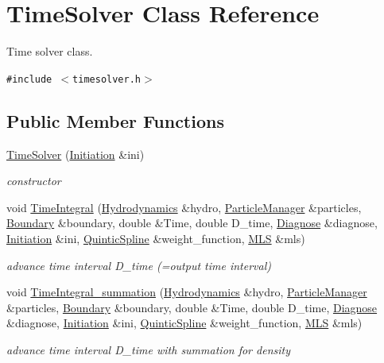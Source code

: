 \hypertarget{classTimeSolver}{
\section{TimeSolver Class Reference}
\label{classTimeSolver}
}
Time solver class.  


{\tt \#include $<$timesolver.h$>$}

\subsection*{Public Member Functions}
\begin{CompactItemize}
\item 
\hyperlink{classTimeSolver_c5ed4d99be532dd9c3e77424b3e7a60a}{TimeSolver} (\hyperlink{classInitiation}{Initiation} \&ini)
\begin{CompactList}\small\item\em constructor \item\end{CompactList}\item 
void \hyperlink{classTimeSolver_edd74b3f1e292277b972b938787f4a3c}{TimeIntegral} (\hyperlink{classHydrodynamics}{Hydrodynamics} \&hydro, \hyperlink{classParticleManager}{ParticleManager} \&particles, \hyperlink{classBoundary}{Boundary} \&boundary, double \&Time, double D\_\-time, \hyperlink{classDiagnose}{Diagnose} \&diagnose, \hyperlink{classInitiation}{Initiation} \&ini, \hyperlink{classQuinticSpline}{QuinticSpline} \&weight\_\-function, \hyperlink{classMLS}{MLS} \&mls)
\begin{CompactList}\small\item\em advance time interval D\_\-time (=output time interval) \item\end{CompactList}\item 
void \hyperlink{classTimeSolver_2cbbdd8eecbd3aae12c153f8b9da1402}{TimeIntegral\_\-summation} (\hyperlink{classHydrodynamics}{Hydrodynamics} \&hydro, \hyperlink{classParticleManager}{ParticleManager} \&particles, \hyperlink{classBoundary}{Boundary} \&boundary, double \&Time, double D\_\-time, \hyperlink{classDiagnose}{Diagnose} \&diagnose, \hyperlink{classInitiation}{Initiation} \&ini, \hyperlink{classQuinticSpline}{QuinticSpline} \&weight\_\-function, \hyperlink{classMLS}{MLS} \&mls)
\begin{CompactList}\small\item\em advance time interval D\_\-time with summation for density \item\end{CompactList}\end{CompactItemize}
